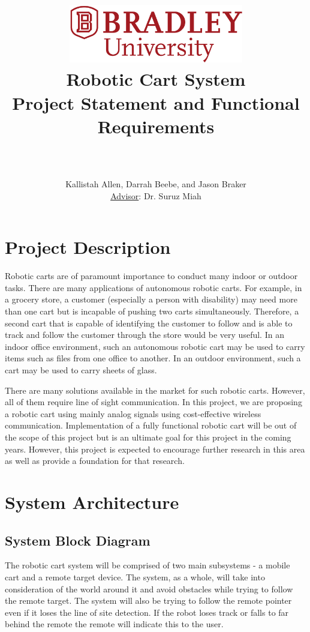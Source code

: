 \documentclass[12pt]{article} %
\title{
    \begin{center}
        \href{http://www.bradley.edu}{\includegraphics[height=1in]{figs/logoBU1-Print}}
        \vskip10pt
        \HRule \\[0.4cm]
        {\Huge \bfseries Robotic Cart System \\\Large Project Statement and Functional Requirements}\\[0.4cm] %
        \HRule \\[0.4cm]
    \end{center}
    }
\author{Kallistah Allen, Darrah Beebe, and Jason Braker \\ \underline{Advisor}: Dr. Suruz Miah}
\begin{document}
\maketitle

\newpage %

\section{Project Description}
Robotic carts are of paramount importance to conduct many indoor or outdoor tasks. There are many applications of autonomous robotic carts. For example, in a grocery store, a customer (especially a person with disability) may need more than one cart but is incapable of pushing two carts simultaneously. Therefore, a second cart that is capable of identifying the customer to follow and is able to track and follow the customer through the store would be very useful. In an indoor office environment, such an autonomous robotic cart may be used to carry items such as files from one office to another. In an outdoor environment, such a cart may be used to carry sheets of glass.

There are many solutions available in the market for such robotic carts. However, all of them require line of sight communication. In this project, we are proposing a robotic cart using mainly analog signals using cost-effective wireless communication. Implementation of a fully functional robotic cart will be out of the scope of this project but is an ultimate goal for this project in the coming years. However, this project is expected to encourage further research in this area as well as provide a foundation for that research.

\section{System Architecture}
\subsection{System Block Diagram}
The robotic cart system will be comprised of two main subsystems - a mobile cart and a remote target device. The system, as a whole, will take into consideration of the world around it and avoid obstacles while trying to follow the remote target.  The system will also be trying to follow the remote pointer even if it loses the line of site detection.  If the robot loses track or falls to far behind the remote the remote will indicate this to the user.
\end{document}
